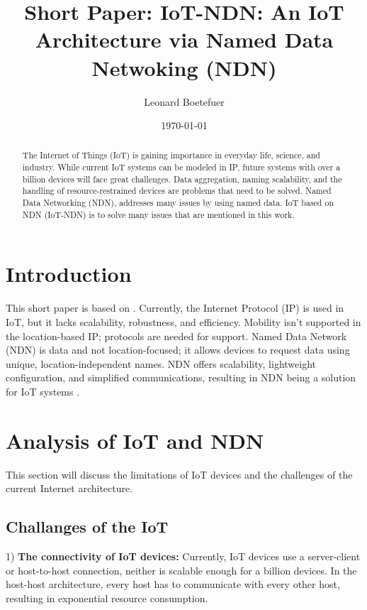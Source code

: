 \documentclass[conference]{IEEEtran}
\title{\textbf{Short Paper:} IoT-NDN: An IoT Architecture via Named Data
Netwoking (NDN)\\}
\author{Leonard Boetefuer}
\date{\today}
\begin{document}
\maketitle

\begin{abstract}
  The Internet of Things (IoT) is gaining importance in everyday life, science, and industry. 
  While current IoT systems can be modeled in IP, 
  future systems with over a billion devices will face great challenges. 
  Data aggregation, naming scalability, 
  and the handling of resource-restrained devices are problems that need to be solved. 
  Named Data Networking (NDN), addresses many issues by using named data. 
  IoT based on NDN (IoT-NDN) is to solve many issues that are mentioned in this work.
  
  \end{abstract}
  
  \section{Introduction}
  
  
  
  This short paper is based on \cite{b99}.
  Currently, the Internet Protocol (IP) is used in IoT, but it lacks scalability, robustness, and efficiency. Mobility isn't supported in the location-based IP; protocols are needed for support.
  Named Data Network (NDN) is data and not location-focused; it allows devices to request data using unique, location-independent names. NDN offers scalability, lightweight configuration, and simplified communications, resulting in NDN being a solution for IoT systems \cite{b1}.
  
   
  \section{Analysis of IoT and NDN}
  This section will discuss the limitations of IoT devices and the challenges of the current Internet architecture.
  \subsection{Challanges of the IoT}
  1) \textbf{The connectivity of IoT devices:}
  Currently, IoT devices use a server-client or host-to-host connection, neither is scalable enough for a billion devices.
  In the host-host architecture, every host has to communicate with every other host, resulting in exponential resource consumption.
  
\end{document}
